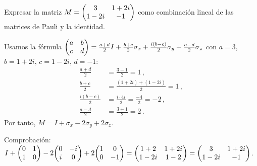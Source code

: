 \begin{questions}
  \begin{solution}
  \end{solution}


  \question
  Expresar la matriz $M=\mqty(3&1+2i\\1-2i&-1)$ como combinación lineal de las matrices de Pauli y la identidad.
  \begin{solution}
    Usamos la fórmula $\mqty(a&b\\c&d)=\frac{a+d}{2}I+\frac{b+c}{2}\sigma_x+\frac{i(b-c)}{2}\sigma_y+\frac{a-d}{2}\sigma_z$ con $a=3$, $b=1+2i$, $c=1-2i$, $d=-1$:
    \begin{align*}
      \frac{a+d}{2}    & = \frac{3-1}{2}=1\,,                     \\
      \frac{b+c}{2}    & = \frac{(1+2i)+(1-2i)}{2}=1\,,           \\
      \frac{i(b-c)}{2} & = \frac{i\cdot 4i}{2}=\frac{-4}{2}=-2\,, \\
      \frac{a-d}{2}    & = \frac{3+1}{2}=2\,.
    \end{align*}
    Por tanto, $M = I + \sigma_x - 2\sigma_y + 2\sigma_z$.

    Comprobación: $I+\mqty(0&1\\1&0)-2\mqty(0&-i\\i&0)+2\mqty(1&0\\0&-1)=\mqty(1+2&1+2i\\1-2i&1-2)=\mqty(3&1+2i\\1-2i&-1)$. \checkmark
  \end{solution}


\end{questions}
